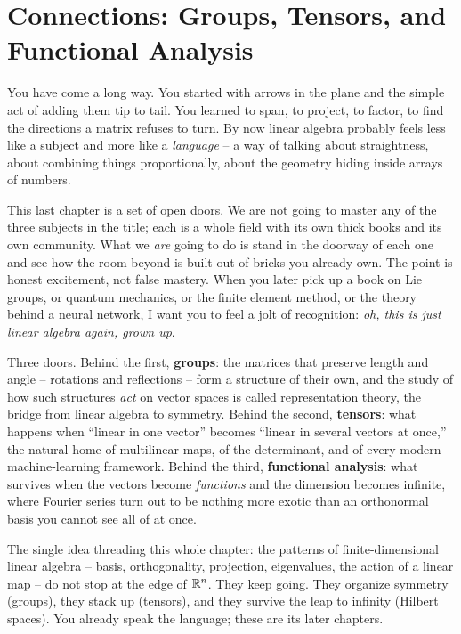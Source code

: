 \chapter{Connections: Groups, Tensors, and Functional Analysis}

You have come a long way. You started with arrows in the plane and the simple act
of adding them tip to tail. You learned to span, to project, to factor, to find
the directions a matrix refuses to turn. By now linear algebra probably feels
less like a subject and more like a \emph{language} -- a way of talking about
straightness, about combining things proportionally, about the geometry hiding
inside arrays of numbers.

This last chapter is a set of open doors. We are not going to master any of the
three subjects in the title; each is a whole field with its own thick books and
its own community. What we \emph{are} going to do is stand in the doorway of each
one and see how the room beyond is built out of bricks you already own. The point
is honest excitement, not false mastery. When you later pick up a book on Lie
groups, or quantum mechanics, or the finite element method, or the theory behind
a neural network, I want you to feel a jolt of recognition: \emph{oh, this is just
linear algebra again, grown up}.

Three doors. Behind the first, \textbf{groups}: the matrices that preserve
length and angle -- rotations and reflections -- form a structure of their own,
and the study of how such structures \emph{act} on vector spaces is called
representation theory, the bridge from linear algebra to symmetry. Behind the
second, \textbf{tensors}: what happens when ``linear in one vector'' becomes
``linear in several vectors at once,'' the natural home of multilinear maps, of
the determinant, and of every modern machine-learning framework. Behind the third,
\textbf{functional analysis}: what survives when the vectors become \emph{functions}
and the dimension becomes infinite, where Fourier series turn out to be nothing
more exotic than an orthonormal basis you cannot see all of at once.

\begin{focusbox}
The single idea threading this whole chapter: the patterns of finite-dimensional
linear algebra -- basis, orthogonality, projection, eigenvalues, the action of a
linear map -- do not stop at the edge of $\mathbb{R}^n$. They keep going. They organize
symmetry (groups), they stack up (tensors), and they survive the leap to infinity
(Hilbert spaces). You already speak the language; these are its later chapters.
\end{focusbox}

